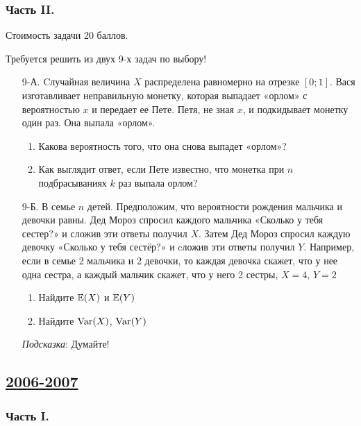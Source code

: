 \subsubsection*{Часть II.}

Стоимость задачи 20 баллов.

Требуется решить \textbf{} из двух 9-х задач по выбору!

\begin{enumerate}
\item[9-А.] Cлучайная величина $X$ распределена равномерно на отрезке $[0;1]$.
Вася изготавливает неправильную монетку, которая выпадает «орлом» с вероятностью
$x$ и передает ее Пете. Петя, не зная $x$, и подкидывает монетку один раз. Она выпала
«орлом».
\begin{enumerate}
\item Какова вероятность того, что она снова выпадет «орлом»?
\item Как выглядит ответ, если Пете известно, что монетка при $n$ подбрасываниях
$k$  раз выпала орлом?
\end{enumerate}

\item[9-Б.] В семье $n$ детей. Предположим, что вероятности рождения мальчика и
девочки равны. Дед Мороз спросил каждого мальчика «Сколько у тебя сестер?» и сложив
эти ответы получил $X$. Затем Дед Мороз спросил каждую девочку «Сколько у тебя сестёр?»
и cложив эти ответы получил $Y$. Например, если в семье 2 мальчика и 2 девочки, то
каждая девочка скажет, что у нее одна сестра, а каждый мальчик скажет, что у него 2
сестры, $X = 4$, $Y = 2$
\begin{enumerate}
\item Найдите $\operatorname{\mathbb{E}}(X)$ и $\operatorname{\mathbb{E}}(Y)$
\item Найдите $\operatorname{Var}(X)$, $\operatorname{Var}(Y)$
\end{enumerate}
\emph{Подсказка}: Думайте!
\end{enumerate}



\newpage
\subsection[2006-2007]{\hyperref[sec:sol_kr_02_2006_2007]{2006-2007}}
\label{sec:kr_02_2006_2007}

\subsubsection*{Часть I.}

